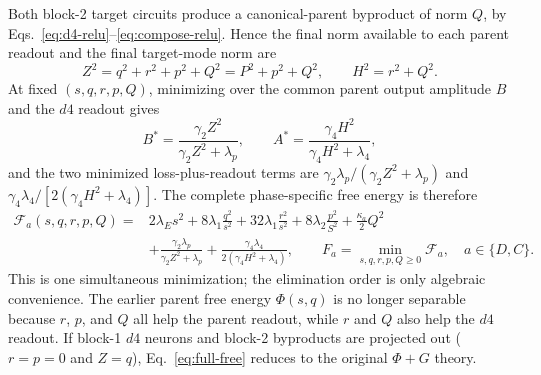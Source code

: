 \documentclass[10pt]{article}
\begin{document}
Both block-2 target circuits produce a canonical-parent byproduct of norm $Q$, by
Eqs.~\eqref{eq:d4-relu}--\eqref{eq:compose-relu}.  Hence the final norm available to each
parent readout and the final target-mode norm are
\begin{equation}
Z^2=q^2+r^2+p^2+Q^2=P^2+p^2+Q^2,
\qquad H^2=r^2+Q^2.
\label{eq:ZH}
\end{equation}
At fixed $(s,q,r,p,Q)$, minimizing over the common parent output amplitude $B$ and the $d4$
readout gives
\begin{equation}
B^*=\frac{\gamma_2Z^2}{\gamma_2Z^2+\lambda_p},\qquad
A^*=\frac{\gamma_4H^2}{\gamma_4H^2+\lambda_4},
\label{eq:amplitudes}
\end{equation}
and the two minimized loss-plus-readout terms are
$\gamma_2\lambda_p/(\gamma_2Z^2+\lambda_p)$ and
$\gamma_4\lambda_4/[2(\gamma_4H^2+\lambda_4)]$.  The complete phase-specific free energy is
therefore
\begin{align}
\mathcal F_a(s,q,r,p,Q)={}&2\lambda_Es^2
+8\lambda_1\frac{q^2}{s^2}+32\lambda_1\frac{r^2}{s^2}
+8\lambda_2\frac{p^2}{S^2}+\frac{\kappa_a}{2}Q^2\nonumber\\[-2pt]
&+\frac{\gamma_2\lambda_p}{\gamma_2Z^2+\lambda_p}
+\frac{\gamma_4\lambda_4}{2(\gamma_4H^2+\lambda_4)},
\qquad
\boxed{F_a=\min_{s,q,r,p,Q\geq0}\mathcal F_a},
\quad a\in\{D,C\}.
\label{eq:full-free}
\end{align}
This is one simultaneous minimization; the elimination order is only algebraic convenience.
The earlier parent free energy $\Phi(s,q)$ is no longer separable because $r$, $p$, and $Q$
all help the parent readout, while $r$ and $Q$ also help the $d4$ readout.  If block-1 $d4$
neurons and block-2 byproducts are projected out ($r=p=0$ and $Z=q$),
Eq.~\eqref{eq:full-free} reduces to the original $\Phi+G$ theory.
\end{document}
